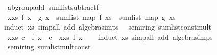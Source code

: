 \begin{isabellebody}
\endisatagproof
{\isafoldproof}%
%
\isadelimproof
\isanewline
%
\endisadelimproof
\isanewline
{}\isamarkupfalse%
\ {\isacharparenleft}{\kern0pt}\ ab{\isacharunderscore}{\kern0pt}group{\isacharunderscore}{\kern0pt}add{\isacharparenright}{\kern0pt}\ sum{\isacharunderscore}{\kern0pt}list{\isacharunderscore}{\kern0pt}subtractf{\isacharcolon}{\kern0pt}\isanewline
\ \ {\isachardoublequoteopen}{\isacharparenleft}{\kern0pt}{\isasymSum}x{\isasymleftarrow}xs{\isachardot}{\kern0pt}\ f\ x\ {\isacharminus}{\kern0pt}\ g\ x{\isacharparenright}{\kern0pt}\ {\isacharequal}{\kern0pt}\ sum{\isacharunderscore}{\kern0pt}list\ {\isacharparenleft}{\kern0pt}map\ f\ xs{\isacharparenright}{\kern0pt}\ {\isacharminus}{\kern0pt}\ sum{\isacharunderscore}{\kern0pt}list\ {\isacharparenleft}{\kern0pt}map\ g\ xs{\isacharparenright}{\kern0pt}{\isachardoublequoteclose}\isanewline
%
\isadelimproof
\ \ %
\endisadelimproof
%
\isatagproof
{}\isamarkupfalse%
\ {\isacharparenleft}{\kern0pt}induct\ xs{\isacharparenright}{\kern0pt}\ {\isacharparenleft}{\kern0pt}simp{\isacharunderscore}{\kern0pt}all\ add{\isacharcolon}{\kern0pt}\ algebra{\isacharunderscore}{\kern0pt}simps{\isacharparenright}{\kern0pt}%
\endisatagproof
{\isafoldproof}%
%
\isadelimproof
\isanewline
%
\endisadelimproof
\isanewline
{}\isamarkupfalse%
\ {\isacharparenleft}{\kern0pt}\ semiring{\isacharunderscore}{\kern0pt}{}{\isacharparenright}{\kern0pt}\ sum{\isacharunderscore}{\kern0pt}list{\isacharunderscore}{\kern0pt}const{\isacharunderscore}{\kern0pt}mult{\isacharcolon}{\kern0pt}\isanewline
\ \ {\isachardoublequoteopen}{\isacharparenleft}{\kern0pt}{\isasymSum}x{\isasymleftarrow}xs{\isachardot}{\kern0pt}\ c\ {\isacharasterisk}{\kern0pt}\ f\ x{\isacharparenright}{\kern0pt}\ {\isacharequal}{\kern0pt}\ c\ {\isacharasterisk}{\kern0pt}\ {\isacharparenleft}{\kern0pt}{\isasymSum}x{\isasymleftarrow}xs{\isachardot}{\kern0pt}\ f\ x{\isacharparenright}{\kern0pt}{\isachardoublequoteclose}\isanewline
%
\isadelimproof
\ \ %
\endisadelimproof
%
\isatagproof
{}\isamarkupfalse%
\ {\isacharparenleft}{\kern0pt}induct\ xs{\isacharparenright}{\kern0pt}\ {\isacharparenleft}{\kern0pt}simp{\isacharunderscore}{\kern0pt}all\ add{\isacharcolon}{\kern0pt}\ algebra{\isacharunderscore}{\kern0pt}simps{\isacharparenright}{\kern0pt}%
\endisatagproof
{\isafoldproof}%
%
\isadelimproof
\isanewline
%
\endisadelimproof
\isanewline
{}\isamarkupfalse%
\ {\isacharparenleft}{\kern0pt}\ semiring{\isacharunderscore}{\kern0pt}{}{\isacharparenright}{\kern0pt}\ sum{\isacharunderscore}{\kern0pt}list{\isacharunderscore}{\kern0pt}mult{\isacharunderscore}{\kern0pt}const{\isacharcolon}{\kern0pt}\isanewline

\end{isabellebody}
